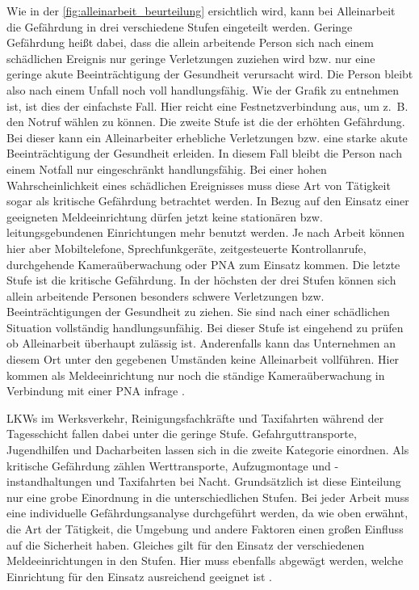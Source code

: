 \documentclass[thesis.tex]{subfiles}
\begin{document}
Wie in der \autoref{fig:alleinarbeit_beurteilung} ersichtlich wird, kann bei Alleinarbeit die Gefährdung in drei verschiedene Stufen eingeteilt werden.
Geringe Gefährdung heißt dabei, dass die allein arbeitende Person sich nach einem schädlichen Ereignis nur geringe Verletzungen zuziehen wird bzw. nur eine geringe akute Beeinträchtigung der Gesundheit verursacht wird.
Die Person bleibt also nach einem Unfall noch voll handlungsfähig.
Wie der Grafik zu entnehmen ist, ist dies der einfachste Fall.
Hier reicht eine Festnetzverbindung aus, um z.~B. den Notruf wählen zu können.
Die zweite Stufe ist die der erhöhten Gefährdung.
Bei dieser kann ein Alleinarbeiter erhebliche Verletzungen bzw. eine starke akute Beeinträchtigung der Gesundheit erleiden.
In diesem Fall bleibt die Person nach einem Notfall nur eingeschränkt handlungsfähig.
Bei einer hohen Wahrscheinlichkeit eines schädlichen Ereignisses muss diese Art von Tätigkeit sogar als kritische Gefährdung betrachtet werden.
In Bezug auf den Einsatz einer geeigneten Meldeeinrichtung dürfen jetzt keine stationären bzw. leitungsgebundenen Einrichtungen mehr benutzt werden.
Je nach Arbeit können hier aber Mobiltelefone, Sprechfunkgeräte, zeitgesteuerte Kontrollanrufe, durchgehende Kameraüberwachung oder PNA zum Einsatz kommen.
Die letzte Stufe ist die kritische Gefährdung.
In der höchsten der drei Stufen können sich allein arbeitende Personen besonders schwere Verletzungen bzw. Beeinträchtigungen der Gesundheit zu ziehen.
Sie sind nach einer schädlichen Situation vollständig handlungsunfähig.
Bei dieser Stufe ist eingehend zu prüfen ob Alleinarbeit überhaupt zulässig ist.
Anderenfalls kann das Unternehmen an diesem Ort unter den gegebenen Umständen keine Alleinarbeit vollführen.
Hier kommen als Meldeeinrichtung nur noch die ständige Kameraüberwachung in Verbindung mit einer PNA infrage \cite[vgl.~S.~7-9][]{Information_212-139}.

LKWs im Werksverkehr, Reinigungsfachkräfte und Taxifahrten während der Tagesschicht fallen dabei unter die geringe Stufe.
Gefahrguttransporte, Jugendhilfen und Dacharbeiten lassen sich in die zweite Kategorie einordnen.
Als kritische Gefährdung zählen Werttransporte, Aufzugmontage und -instandhaltungen und Taxifahrten bei Nacht.
Grundsätzlich ist diese Einteilung nur eine grobe Einordnung in die unterschiedlichen Stufen.
Bei jeder Arbeit muss eine individuelle Gefährdungsanalyse durchgeführt werden, da wie oben erwähnt, die Art der Tätigkeit, die Umgebung und andere Faktoren einen großen Einfluss auf die Sicherheit haben.
Gleiches gilt für den Einsatz der verschiedenen Meldeeinrichtungen in den Stufen.
Hier muss ebenfalls abgewägt werden, welche Einrichtung für den Einsatz ausreichend geeignet ist \cite[vgl.~S.~7-9][]{Information_212-139}.
\end{document}
